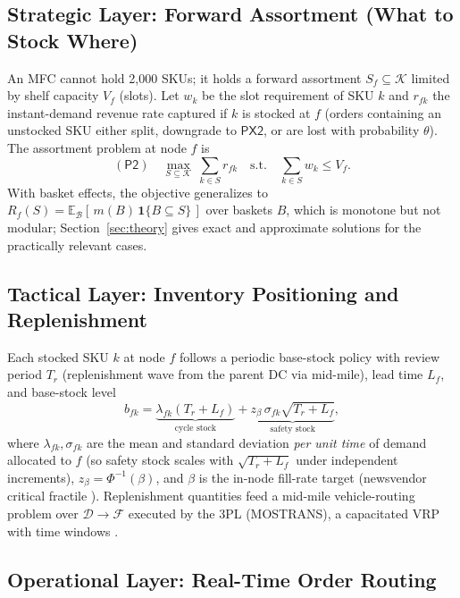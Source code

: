 \documentclass[journal]{IEEEtran}
\begin{document}
\subsection{Strategic Layer: Forward Assortment (What to Stock Where)}

An MFC cannot hold 2{,}000 SKUs; it holds a forward assortment $S_f \subseteq \mathcal{K}$ limited by shelf capacity $V_f$ (slots). Let $w_k$ be the slot requirement of SKU $k$ and $r_{fk}$ the instant-demand revenue rate captured if $k$ is stocked at $f$ (orders containing an unstocked SKU either split, downgrade to $\mathsf{PX2}$, or are lost with probability $\theta$). The assortment problem at node $f$ is
\begin{equation}
\label{eq:assort}
(\mathsf{P2})\quad \max_{S \subseteq \mathcal{K}} \ \sum_{k \in S} r_{fk} \quad \text{s.t.} \quad \sum_{k \in S} w_k \le V_f .
\end{equation}
With basket effects, the objective generalizes to $R_f(S) = \mathbb{E}_{\mathcal{B}}[\,m(B)\,\mathbf{1}\{B \subseteq S\}\,]$ over baskets $B$, which is monotone but not modular; Section~\ref{sec:theory} gives exact and approximate solutions for the practically relevant cases.

\subsection{Tactical Layer: Inventory Positioning and Replenishment}

Each stocked SKU $k$ at node $f$ follows a periodic base-stock policy with review period $T_r$ (replenishment wave from the parent DC via mid-mile), lead time $L_f$, and base-stock level
\begin{equation}
\label{eq:basestock}
b_{fk} = \underbrace{\lambda_{fk} (T_r + L_f)}_{\text{cycle stock}} + \underbrace{z_{\beta}\, \sigma_{fk} \sqrt{T_r + L_f}}_{\text{safety stock}},
\end{equation}
where $\lambda_{fk}, \sigma_{fk}$ are the mean and standard deviation \emph{per unit time} of demand allocated to $f$ (so safety stock scales with $\sqrt{T_r + L_f}$ under independent increments), $z_\beta = \Phi^{-1}(\beta)$, and $\beta$ is the in-node fill-rate target (newsvendor critical fractile \cite{eppen,graves}). Replenishment quantities feed a mid-mile vehicle-routing problem over $\mathcal{D} \to \mathcal{F}$ executed by the 3PL (MOSTRANS), a capacitated VRP with time windows \cite{tothvigo}.

\subsection{Operational Layer: Real-Time Order Routing}
\end{document}
